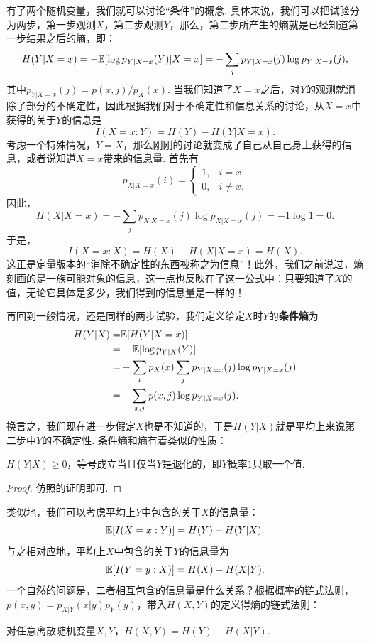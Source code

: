 有了两个随机变量，我们就可以讨论“条件”的概念. 具体来说，我们可以把试验分为两步，第一步观测$X$，第二步观测$Y$，那么，第二步所产生的熵就是已经知道第一步结果之后的熵，即：
\[H(Y| X=x)=-\mathbb{E}[\log p_{Y| X=x}(Y)| X=x]=-\sum_{j}p_{Y|X=x}(j)\log p_{Y|X=x}(j),\]
其中$p_{Y|X=x}(j)=p(x,j)/p_X(x)$. 当我们知道了$X=x$之后，对$Y$的观测就消除了部分的不确定性，因此根据我们对于不确定性和信息关系的讨论，从$X=x$中获得的关于$Y$的信息是
\[I(X=x:Y)=H(Y)-H(Y|X=x).\]
考虑一个特殊情况，$Y=X$，那么刚刚的讨论就变成了自己从自己身上获得的信息，或者说知道$X=x$带来的信息量. 首先有
\[p_{X|X=x}(i)=\begin{cases}
    1,&i=x\\
    0,&i\ne x.
\end{cases}\]
因此，
\[H(X| X=x)=-\sum_{j}p_{X|X=x}(j)\log p_{X|X=x}(j)=-1\log 1=0.\]
于是，
\[I(X=x:X)=H(X)-H(X|X=x)=H(X).\]
这正是定量版本的“消除不确定性的东西被称之为信息”！此外，我们之前说过，熵刻画的是一族可能对象的信息，这一点也反映在了这一公式中：只要知道了$X$的值，无论它具体是多少，我们得到的信息量是一样的！

再回到一般情况，还是同样的两步试验，我们定义给定$X$时$Y$的\textbf{条件熵}为
\begin{align*}
    H(Y| X)=&\mathbb{E}[H(Y|X=x)]\\
    =&-\mathbb{E}[\log p_{Y| X}(Y)]\\
    =&-\sum_x p_{X}(x)\sum_{j}p_{Y|X=x}(j)\log p_{Y|X=x}(j)\\
    =&-\sum_{x,j}p(x,j)\log p_{Y|X=x}(j).
\end{align*}
换言之，我们现在进一步假定$X$也是不知道的，于是$H(Y|X)$就是平均上来说第二步中$Y$的不确定性. 条件熵和熵有着类似的性质：
\begin{proposition}\label{prop:conditional-entropy-nonnegative}
    $H(Y|X)\geq 0$，等号成立当且仅当$Y$是退化的，即$Y$概率$1$只取一个值.
\end{proposition}
\begin{proof}
    仿照的证明即可.
\end{proof}
类似地，我们可以考虑平均上$Y$中包含的关于$X$的信息量：
\[\mathbb{E}[I(X=x:Y)]=H(Y)-H(Y|X).\]
与之相对应地，平均上$X$中包含的关于$Y$的信息量为
\[\mathbb{E}[I(Y=y:X)]=H(X)-H(X|Y).\]
一个自然的问题是，二者相互包含的信息量是什么关系？根据概率的链式法则，$p(x,y)=p_{X|Y}(x|y)p_Y(y)$，带入$H(X,Y)$的定义得熵的链式法则：

\begin{proposition}\label{prop:entropy-chain-rule}
    对任意离散随机变量$X,Y$，$H(X,Y)=H(Y)+H(X|Y)$.    
\end{proposition}

